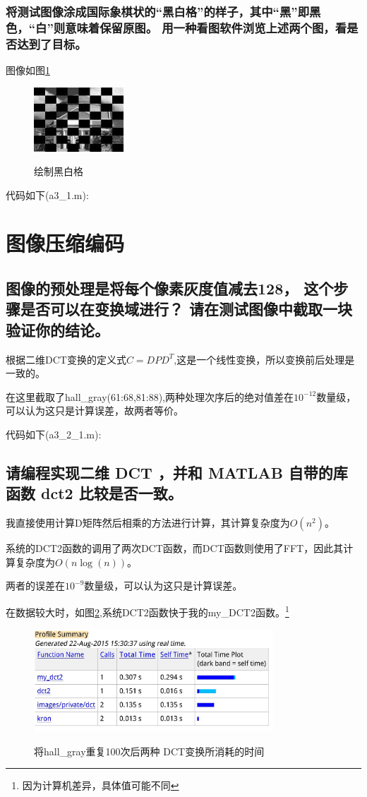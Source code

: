 \documentclass{ctexart}
\begin{document}
\subsubsection{将测试图像涂成国际象棋状的“黑白格”的样子，其中“黑”即黑色，“白”则意味着保留原图。 用一种看图软件浏览上述两个图，看是否达到了目标。}
图像如图\ref{1board}
\begin{figure}
    \centering
    \includegraphics[width=0.3\textwidth]{pic/board.jpg}\\
    \caption{绘制黑白格\label{1board}}
\end{figure}

代码如下(a3\_1.m):


\section{图像压缩编码}
\subsection{
图像的预处理是将每个像素灰度值减去128，
这个步骤是否可以在变换域进行？
请在测试图像中截取一块验证你的结论。}
根据二维DCT变换的定义式$C=DPD^T$,这是一个线性变换，所以变换前后处理是一致的。

在这里截取了hall\_gray(61:68,81:88),两种处理次序后的绝对值差在$10^{-12}$数量级，可以认为这只是计算误差，故两者等价。

代码如下(a3\_2\_1.m):


\subsection{
请编程实现二维 DCT ，并和 MATLAB 自带的库函数 dct2 比较是否一致。}
我直接使用计算D矩阵然后相乘的方法进行计算，其计算复杂度为$O(n^2)$。

系统的DCT2函数的调用了两次DCT函数，而DCT函数则使用了FFT，因此其计算复杂度为$O(n\log (n))$。

两者的误差在$10^{-9}$数量级，可以认为这只是计算误差。

在数据较大时，如图\ref{a322},系统DCT2函数快于我的my\_DCT2函数。\footnote{因为计算机差异，具体值可能不同}
\begin{figure}
    \centering
    \includegraphics[width=0.8\textwidth]{pic/a3_2_2.jpg}\\
    \caption{将hall\_gray重复100次后两种
    DCT变换所消耗的时间\label{a322}}
\end{figure}
\end{document}
